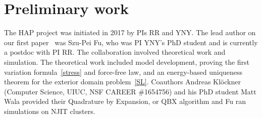 \begin{table}
  \vspace{-8pt}
\caption{\label{tab:moduli} \footnotesize Comparision of values elastic
  moduli from the experimental literature and values derived by HAP
  simulation.} 
\end{table}
\section{Preliminary work}
\label{sec:preliminary_work}
The HAP project was initiated in 2017 by PIs RR and YNY. The lead author
on our first paper~\cite{Fu2018_SIAM} was Szu-Pei Fu, who was PI YNY's
PhD student and is currently a postdoc with PI RR. The collaboration
involved theoretical work and simulation. The theoretical work included
model development, proving the first variation formula~\eqref{stress}
and force-free law, and an energy-based uniqueness theorem for the
exterior domain problem~\eqref{SL}. Coauthors Andreas Kl\"ockner
(Computer Science, UIUC, NSF CAREER \#1654756) and his PhD student Matt
Wala provided their Quadrature by Expansion, or QBX algorithm and Fu ran
simulations on NJIT clusters.

